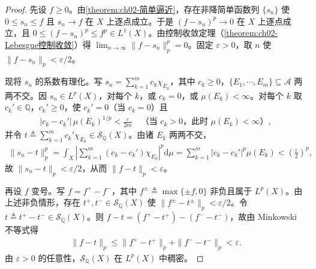\documentclass[../../main.tex]{subfiles}%
\begin{document}
\begin{proof}
先设 $f\geqslant0$。由\cref{theorem:ch02-简单逼近}，存在非降简单函数列 $\{s_n\}$ 使 $0\leqslant s_n\leqslant f$ 且 $s_n\to f$ 在 $X$ 上逐点成立。于是 $(f-s_n)^p\to0$ 在 $X$ 上逐点成立，且 $0\leqslant(f-s_n)^p\leqslant f^p\in L^1(X)$。由控制收敛定理（\cref{theorem:ch02-Lebesgue控制收敛}）得 $\lim_{n\to\infty}\|f-s_n\|_p^p=0$。固定 $\varepsilon>0$，取 $n$ 使 $\|f-s_n\|_p<\varepsilon/2$。

现将 $s_n$ 的系数有理化。写 $s_n=\sum_{k=1}^m c_k\chi_{E_k}$，其中 $c_k\geqslant0$，$\{E_1,\cdots ,E_m\}\subseteq\mathscr A$ 两两不交。因 $s_n\in L^p(X)$，对每个 $k$，或 $c_k=0$，或 $\mu(E_k)<\infty$。对每个 $k$ 取 $c_k'\in\mathbb Q$，$c_k'\geqslant0$，使 $c_k'=0$（当 $c_k=0$）且
\begin{align*}
|c_k-c_k'|\,\mu(E_k)^{1/p}<\frac{\varepsilon}{2m}\quad\text{（当 }c_k>0\text{，此时 }\mu(E_k)<\infty\text{）},
\end{align*}
并令 $t\triangleq\sum_{k=1}^m c_k'\chi_{E_k}\in\mathscr S_{\mathbb Q}(X)$。由诸 $E_k$ 两两不交，
\begin{align*}
\|s_n-t\|_p^p=\int_X\left|\sum_{k=1}^m(c_k-c_k')\chi_{E_k}\right|^p\mathrm{d}\mu
=\sum_{k=1}^m|c_k-c_k'|^p\mu(E_k)<\left(\frac{\varepsilon}{2}\right)^p,
\end{align*}
故 $\|s_n-t\|_p<\varepsilon/2$，从而 $\|f-t\|_p<\varepsilon$。

再设 $f$ 变号。写 $f=f^+-f^-$，其中 $f^\pm\triangleq\max\{\pm f,0\}$ 非负且属于 $L^p(X)$。由上述非负情形，存在 $t^+,t^-\in\mathscr S_{\mathbb Q}(X)$ 使 $\|f^\pm-t^\pm\|_p<\varepsilon/2$。令 $t\triangleq t^+-t^-\in\mathscr S_{\mathbb Q}(X)$。则 $f-t=(f^+-t^+)-(f^--t^-)$，故由 Minkowski 不等式得
\begin{align*}
\|f-t\|_p\leqslant\|f^+-t^+\|_p+\|f^--t^-\|_p<\varepsilon.
\end{align*}
由 $\varepsilon>0$ 的任意性，$\mathscr S_{\mathbb Q}(X)$ 在 $L^p(X)$ 中稠密。
\end{proof}
\end{document}
